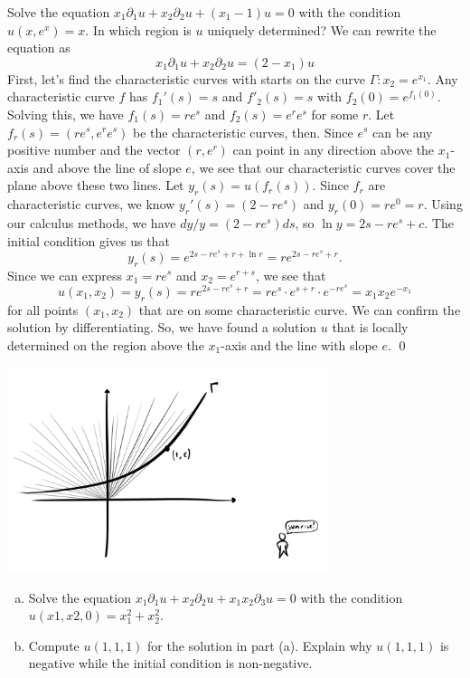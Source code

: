 \documentclass{article}
\renewcommand{\d}{\partial}
\begin{document}
\newpage
{} Solve the equation $x_1\d_1u+x_2\d_2u+(x_1-1)u = 0$ with the condition $u(x, e^x) = x$.
In which region is $u$ uniquely determined?\tri
\hop
\solution We can rewrite the equation as 
\[x_1\d_1u+x_2\d_2u=(2-x_1)u\]
First, let's find the characteristic curves with starts on the curve $\Gamma: x_2 = e^{x_1}$. Any characteristic curve $f$ has $f_1'(s) = s$ and $f'_2(s) = s$ with $f_2(0)=e^{f_1(0)}$. 
\hop 
Solving this, we have $f_1(s) = re^s$ and $f_2(s) = e^re^s$ for some $r$. Let $f_r(s) = (re^s, e^re^s)$ be the characteristic curves, then. Since $e^s$ can be any positive number and the vector $(r,e^r)$ can point in any direction above the $x_1$-axis and above the line of slope $e$, we see that our characteristic curves cover the plane above these two lines.
\hop %
Let $y_r(s) = u(f_r(s))$. Since $f_r$ are characteristic curves, we know $y_r'(s)=(2-re^s)$ and $y_r(0)=re^0 = r$. Using our calculus methods, we have $dy/y = (2-re^s)ds$, so $\ln y = 2s-re^s+c$. The initial condition gives us that  
\[y_r(s)=e^{2s-re^s+r+\ln r}=re^{2s-re^s+r}.\]
Since we can express $x_1 = re^s$ and $x_2 = e^{r+s}$, we see that 
\[u(x_1,x_2) = y_r(s) = re^{2s-re^s+r} = re^s \cdot e^{s+r}\cdot e^{-re^s} = x_1x_2e^{-x_1}\]
for all points $(x_1, x_2)$ that are on some characteristic curve. We can confirm the solution by differentiating. So, we have found a solution $u$ that is locally determined on the region above the $x_1$-axis and the line with slope $e$. \qed
\begin{center}
    \includegraphics[height=6cm]{../images/sunrise}
\end{center}
\newpage
{} 
\begin{enumerate}[(a)]
    \item Solve the equation $x_1\d_1u+x_2\d_2u+x_1x_2\d_3u = 0$ with the condition $u(x1, x2, 0) =
    x^2_1 + x^2_2$.
    \item Compute $u(1, 1, 1)$ for the solution in part (a). Explain why $u(1, 1, 1)$ is negative while the
    initial condition is non-negative.
\end{enumerate}
\end{document}
